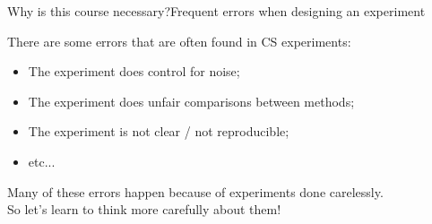 \documentclass[aspectratio=169]{beamer}
\begin{document}
\begin{frame}{Why is this course necessary?}{Frequent errors when designing an experiment}

  There are some errors that are often found in CS experiments:
  \bigskip

  \begin{itemize}
    \item The experiment does control for noise;\\
    \item The experiment does unfair comparisons between methods;\\
    \item The experiment is not clear / not reproducible;\\
    \item etc...
  \end{itemize}\bigskip

  Many of these errors happen because of experiments done
  carelessly.\\
  So let's learn to think more carefully about them!


\end{frame}



\end{document}
